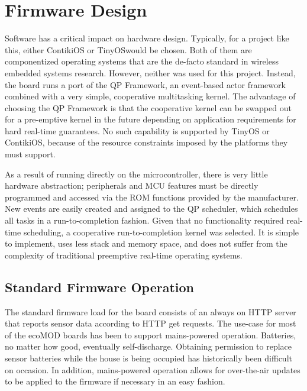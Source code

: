 \chapter{Firmware Design}

Software has a critical impact on hardware design. Typically, for a project like this, either ContikiOS or TinyOSwould be chosen. Both of them are componentized operating systems that are the de-facto standard in wireless embedded systems research. However, neither was used for this project. Instead, the board runs a port of the QP Framework\cite{Samek2008}, an event-based actor framework combined with a very simple, cooperative multitasking kernel. The advantage of choosing the QP Framework is that the cooperative kernel can be swapped out for a pre-emptive kernel in the future depending on application requirements for hard real-time guarantees. No such capability is supported by TinyOS or ContikiOS, because of the resource constraints imposed by the platforms they must support.

As a result of running directly on the microcontroller, there is very little hardware abstraction; peripherals and MCU features must be directly programmed and accessed via the ROM functions provided by the manufacturer. New events are easily created and assigned to the QP scheduler, which schedules all tasks in a run-to-completion fashion. Given that no functionality required real-time scheduling, a cooperative run-to-completion kernel was selected. It is simple to implement, uses less stack and memory space, and does not suffer from the complexity of traditional preemptive real-time operating systems.

\section{Standard Firmware Operation}

The standard firmware load for the board consists of an always on HTTP server that reports sensor data according to HTTP get requests. The use-case for most of the ecoMOD boards has been to support mains-powered operation. Batteries, no matter how good, eventually self-discharge. Obtaining permission to replace sensor batteries while the house is being occupied has historically been difficult on occasion.  In addition, mains-powered operation allows for over-the-air updates to be applied to the firmware if necessary in an easy fashion.

